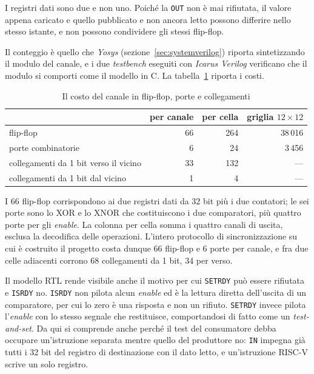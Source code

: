 I registri dati sono due e non uno. Poiché la \texttt{OUT} non è mai rifiutata,
il valore appena caricato e quello pubblicato e non ancora letto possono
differire nello stesso istante, e non possono condividere gli stessi flip-flop.

Il conteggio è quello che \emph{Yosys} (sezione~\ref{sec:systemverilog}) riporta
sintetizzando il modulo del canale, e i due \emph{testbench} eseguiti con
\emph{Icarus Verilog} verificano che il modulo si comporti come il modello in C.
La tabella~\ref{tab:costirtl} riporta i costi.

\begin{table}[htbp]
    \centering
    \begin{tabular}{lrrr}
        \toprule
         & per canale & per cella & griglia $12 \times 12$ \\
        \midrule
        flip-flop & 66 & 264 & 38\,016 \\
        porte combinatorie & 6 & 24 & 3\,456 \\
        collegamenti da 1 bit verso il vicino & 33 & 132 & --- \\
        collegamenti da 1 bit dal vicino & 1 & 4 & --- \\
        \bottomrule
    \end{tabular}
    \caption{Il costo del canale in flip-flop, porte e collegamenti}
    \label{tab:costirtl}
\end{table}


I 66 flip-flop corrispondono ai due registri dati da 32 bit più i due contatori;
le sei porte sono lo XOR e lo XNOR che costituiscono i due comparatori, più quattro porte per gli \emph{enable}. La colonna per cella somma i quattro canali di uscita,
esclusa la decodifica delle operazioni. L'intero protocollo di sincronizzazione su cui è
costruito il progetto costa dunque 66 flip-flop e 6 porte per canale, e
fra due celle adiacenti corrono 68 collegamenti da 1 bit, 34 per verso.

Il modello RTL rende visibile anche il motivo per cui \texttt{SETRDY} può essere
rifiutata e \texttt{ISRDY} no. \texttt{ISRDY} non pilota alcun \emph{enable} ed
è la lettura diretta dell'uscita di un comparatore, per cui lo zero è una
risposta e non un rifiuto. \texttt{SETRDY} invece pilota l'\emph{enable} con lo
stesso segnale che restituisce, comportandosi di fatto come un
\emph{test-and-set}.
Da qui si comprende anche perché il test del consumatore debba occupare un'istruzione
separata mentre quello del produttore no: \texttt{IN} impegna già
tutti i 32 bit del registro di destinazione con il dato letto, e un'istruzione
RISC-V scrive un solo registro.

